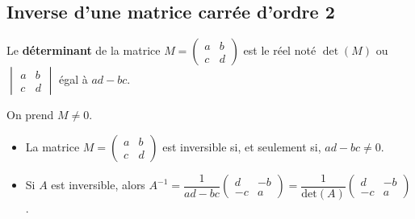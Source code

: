 \documentclass{cornouaille}
\begin{document}
\subsection{Inverse d'une matrice carrée d'ordre 2}

\begin{definition}
Le \textbf{déterminant} de la matrice $M=\begin{pmatrix}
 a & b \\
c & d
\end{pmatrix}$ est le réel noté $\det(M)$ ou $\begin{vmatrix}
 a & b \\
c & d
\end{vmatrix}$ égal à $ad-bc$.
\end{definition}


\begin{theoreme}
On prend $M \neq 0$.
\begin{itemize}
\item La matrice $M=\begin{pmatrix}
 a & b \\
c & d
\end{pmatrix}$  est inversible si, et seulement si, $ad-bc\neq0$.\\
\item Si $A$ est inversible, alors $A^{-1}=\dfrac{1}{ad-bc}\begin{pmatrix}
 d & -b \\
-c & a
\end{pmatrix}=\dfrac{1}{\text{det}(A)}\begin{pmatrix}
 d & -b \\
-c & a
\end{pmatrix}$.
\end{itemize}
\end{theoreme}
\end{document}

